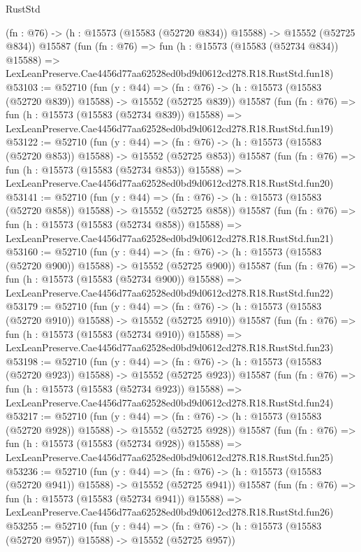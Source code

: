 \begin{lexlean}{RustStd}
\begin{coremodule}
    (fn : @76) -> (h : @15573 (@15583 (@52720 @834)) @15588) -> @15552 (@52725 @834))
    @15587
    (fun (fn : @76) =>
    fun (h : @15573 (@15583 (@52734 @834)) @15588) =>
    LexLeanPreserve.Cae4456d77aa62528ed0bd9d0612cd278.R18.RustStd.fun18)
@53103 := @52710
    (fun (y : @44) =>
    (fn : @76) -> (h : @15573 (@15583 (@52720 @839)) @15588) -> @15552 (@52725 @839))
    @15587
    (fun (fn : @76) =>
    fun (h : @15573 (@15583 (@52734 @839)) @15588) =>
    LexLeanPreserve.Cae4456d77aa62528ed0bd9d0612cd278.R18.RustStd.fun19)
@53122 := @52710
    (fun (y : @44) =>
    (fn : @76) -> (h : @15573 (@15583 (@52720 @853)) @15588) -> @15552 (@52725 @853))
    @15587
    (fun (fn : @76) =>
    fun (h : @15573 (@15583 (@52734 @853)) @15588) =>
    LexLeanPreserve.Cae4456d77aa62528ed0bd9d0612cd278.R18.RustStd.fun20)
@53141 := @52710
    (fun (y : @44) =>
    (fn : @76) -> (h : @15573 (@15583 (@52720 @858)) @15588) -> @15552 (@52725 @858))
    @15587
    (fun (fn : @76) =>
    fun (h : @15573 (@15583 (@52734 @858)) @15588) =>
    LexLeanPreserve.Cae4456d77aa62528ed0bd9d0612cd278.R18.RustStd.fun21)
@53160 := @52710
    (fun (y : @44) =>
    (fn : @76) -> (h : @15573 (@15583 (@52720 @900)) @15588) -> @15552 (@52725 @900))
    @15587
    (fun (fn : @76) =>
    fun (h : @15573 (@15583 (@52734 @900)) @15588) =>
    LexLeanPreserve.Cae4456d77aa62528ed0bd9d0612cd278.R18.RustStd.fun22)
@53179 := @52710
    (fun (y : @44) =>
    (fn : @76) -> (h : @15573 (@15583 (@52720 @910)) @15588) -> @15552 (@52725 @910))
    @15587
    (fun (fn : @76) =>
    fun (h : @15573 (@15583 (@52734 @910)) @15588) =>
    LexLeanPreserve.Cae4456d77aa62528ed0bd9d0612cd278.R18.RustStd.fun23)
@53198 := @52710
    (fun (y : @44) =>
    (fn : @76) -> (h : @15573 (@15583 (@52720 @923)) @15588) -> @15552 (@52725 @923))
    @15587
    (fun (fn : @76) =>
    fun (h : @15573 (@15583 (@52734 @923)) @15588) =>
    LexLeanPreserve.Cae4456d77aa62528ed0bd9d0612cd278.R18.RustStd.fun24)
@53217 := @52710
    (fun (y : @44) =>
    (fn : @76) -> (h : @15573 (@15583 (@52720 @928)) @15588) -> @15552 (@52725 @928))
    @15587
    (fun (fn : @76) =>
    fun (h : @15573 (@15583 (@52734 @928)) @15588) =>
    LexLeanPreserve.Cae4456d77aa62528ed0bd9d0612cd278.R18.RustStd.fun25)
@53236 := @52710
    (fun (y : @44) =>
    (fn : @76) -> (h : @15573 (@15583 (@52720 @941)) @15588) -> @15552 (@52725 @941))
    @15587
    (fun (fn : @76) =>
    fun (h : @15573 (@15583 (@52734 @941)) @15588) =>
    LexLeanPreserve.Cae4456d77aa62528ed0bd9d0612cd278.R18.RustStd.fun26)
@53255 := @52710
    (fun (y : @44) =>
    (fn : @76) -> (h : @15573 (@15583 (@52720 @957)) @15588) -> @15552 (@52725 @957))

\end{coremodule}
\end{lexlean}
